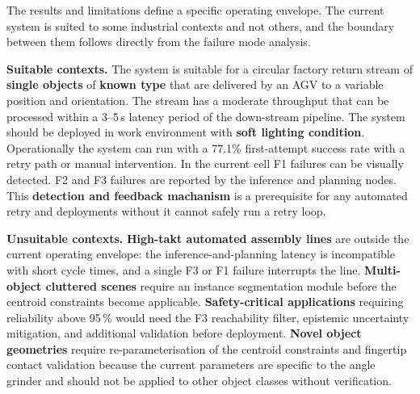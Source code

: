 \documentclass[oneside,studentpaper]{wbk}
\begin{document}
The results and limitations define a specific operating envelope. The current system is suited to some industrial contexts and not others, and the boundary between them follows directly from the failure mode analysis.

\textbf{Suitable contexts.} The system is suitable for a circular factory return stream of \textbf{single objects} of \textbf{known type} that are delivered by an AGV to a variable position and orientation. The stream has a moderate throughput that can be processed within a 3--5\,s latency period of the down-stream pipeline. The system should be deployed in work environment with \textbf{soft lighting condition}. Operationally the system can run with a 77.1\% first-attempt success rate with a retry path or manual intervention. In the current cell F1 failures can be visually detected. F2 and F3 failures are reported by the inference and planning nodes. This \textbf{detection and feedback machanism} is a prerequisite for any automated retry and deployments without it cannot safely run a retry loop.



\textbf{Unsuitable contexts.} \textbf{High-takt automated assembly lines} are outside the current operating envelope: the inference-and-planning latency is incompatible with short cycle times, and a single F3 or F1 failure interrupts the line. \textbf{Multi-object cluttered scenes} require an instance segmentation module before the centroid constraints become applicable. \textbf{Safety-critical applications} requiring reliability above 95\,\% would need the F3 reachability filter, epistemic uncertainty mitigation, and additional validation before deployment. \textbf{Novel object geometries} require re-parameterisation of the centroid constraints and fingertip contact validation because the current parameters are specific to the angle grinder and should not be applied to other object classes without verification.
\end{document}
